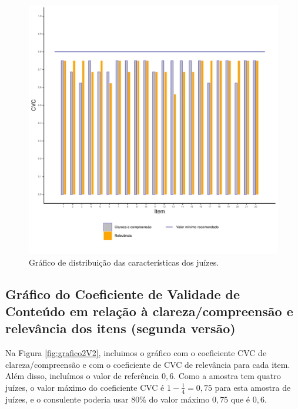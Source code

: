 \documentclass[
]{article}
\begin{document}
\begin{figure}[htbp]

{\centering \includegraphics[width=0.9\linewidth]{figures/grafico2_0_8} 

}

\caption{Gráfico de distribuição das características dos juízes.}\label{fig:grafico2V1}
\end{figure}

\newpage

\hypertarget{gruxe1fico-do-coeficiente-de-validade-de-conteuxfado-em-relauxe7uxe3o-uxe0-clarezacompreensuxe3o-e-relevuxe2ncia-dos-itens-segunda-versuxe3o}{%
\subsection{Gráfico do Coeficiente de Validade de Conteúdo em relação à clareza/compreensão e relevância dos itens (segunda versão)}\label{gruxe1fico-do-coeficiente-de-validade-de-conteuxfado-em-relauxe7uxe3o-uxe0-clarezacompreensuxe3o-e-relevuxe2ncia-dos-itens-segunda-versuxe3o}}

Na Figura \ref{fig:grafico2V2}, incluimos o gráfico com o coeficiente CVC de clareza/compreensão e com o coeficiente de CVC de relevância para cada item. Além disso, incluímos o valor de referência \(0,6\). Como a amostra tem quatro juízes, o valor máximo do coeficiente CVC é \(1-\frac{1}{4}=0,75\) para esta amostra de juízes, e o consulente poderia usar \(80\%\) do valor máximo \(0,75\) que é \(0,6\).
\end{document}
